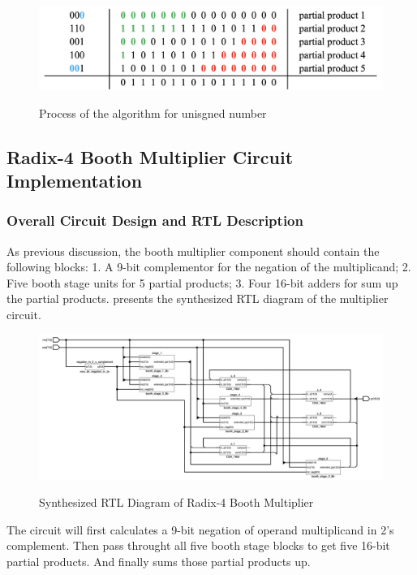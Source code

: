 \begin{figure}[!ht]
	\centering
	\caption{Process of the algorithm for unisgned number}
	\includegraphics[width=5.7in]{../img/r4b_process_2.png}
	\label{fig:r4b_process_2}
\end{figure}

\subsection{Radix-4 Booth Multiplier Circuit Implementation}
\subsubsection{Overall Circuit Design and RTL Description}

As previous discussion, the booth multiplier component should contain the following blocks: 1.
A 9-bit complementor for the negation of the multiplicand;
2. Five booth stage units for 5 partial products;
3. Four 16-bit adders for sum up the partial products.
 presents the synthesized RTL diagram of the multiplier circuit.

\begin{figure}[!ht]
	\centering
	\caption{Synthesized RTL Diagram of Radix-4 Booth Multiplier}
	\includegraphics[width=\textwidth]{../img/overview_booth_rtl.png}
	\label{fig:overview_booth_rtl}
\end{figure}

The circuit will first calculates a 9-bit negation of operand multiplicand in 2's complement.
Then pass throught all five booth stage blocks to get five 16-bit partial products. And finally sums those partial products up.

